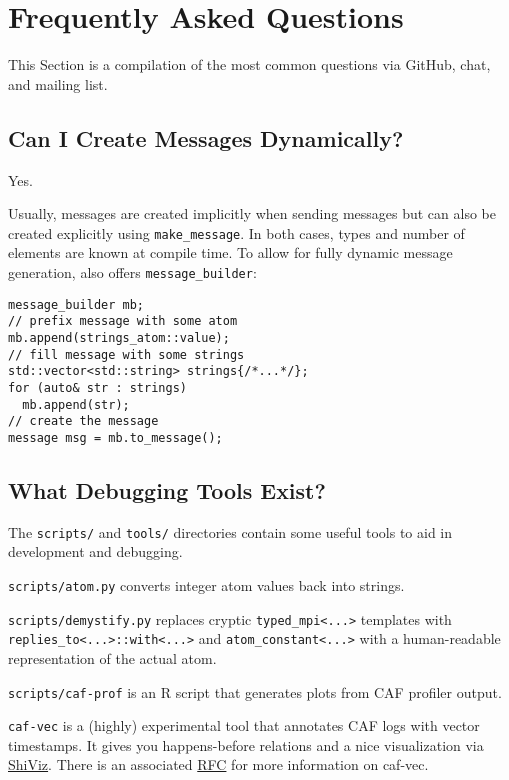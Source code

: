 \section{Frequently Asked Questions}
\label{faq}

This Section is a compilation of the most common questions via GitHub, chat, and mailing list.

\subsection{Can I Create Messages Dynamically?}

Yes.

Usually, messages are created implicitly when sending messages but can also be created explicitly using \lstinline^make_message^.
In both cases, types and number of elements are known at compile time.
To allow for fully dynamic message generation, \lib also offers \lstinline^message_builder^:

\begin{lstlisting}
message_builder mb;
// prefix message with some atom
mb.append(strings_atom::value);
// fill message with some strings
std::vector<std::string> strings{/*...*/};
for (auto& str : strings)
  mb.append(str);
// create the message
message msg = mb.to_message();
\end{lstlisting}

\subsection{What Debugging Tools Exist?}

The \lstinline^scripts/^ and \lstinline^tools/^ directories contain some useful tools to aid in development and debugging.

\lstinline^scripts/atom.py^ converts integer atom values back into strings.

\lstinline^scripts/demystify.py^ replaces cryptic \lstinline^typed_mpi<...>^ templates with \lstinline^replies_to<...>::with<...>^
and \lstinline^atom_constant<...>^ with a human-readable representation of the actual atom.

\lstinline^scripts/caf-prof^ is an R script that generates plots from CAF profiler output.

\lstinline^caf-vec^ is a (highly) experimental tool that annotates CAF logs with vector timestamps. It gives you happens-before
relations and a nice visualization via \href{https://bestchai.bitbucket.io/shiviz/}{ShiViz}. There is an associated
\href{https://github.com/actor-framework/rfcs/blob/master/proposals/0001-minimal-debugging-and-shiviz-support.md}{RFC} for more information on
caf-vec.